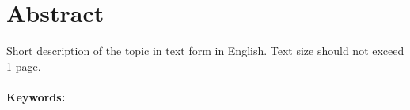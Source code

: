\documentclass[../main.tex]{subfiles}
\begin{document}
    

\section*{Abstract}  

Short description of the topic in text form in English. Text size should not exceed 1 page.\\

\hrulefill
\\
\textbf{Keywords:} 
\end{document}
